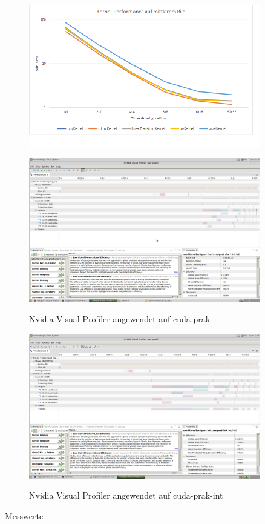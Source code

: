 \documentclass[12pt,a4paper]{scrartcl}
\begin{document}
\begin{figure}[h]
    \caption{}
    \includegraphics[width=0.9\textwidth]{times(kernel).png}
    \label{fig:timekernel}
\end{figure}

\begin{figure}[h]
    \caption{Nvidia Visual Profiler angewendet auf cuda-prak}
    \includegraphics[width=0.9\textwidth]{Sobel_Char_Efficiency.png}
    \label{fig:sobelchar}
\end{figure}

\begin{figure}[h]
    \caption{Nvidia Visual Profiler angewendet auf cuda-prak-int}
    \includegraphics[width=0.9\textwidth]{Sobel_Int_Efficiency.png}
    \label{fig:sobelint}
\end{figure}

\begin{table}[h]
    \caption{Messwerte}
    \label{tab:messwerte}
\end{table}
\end{document}
